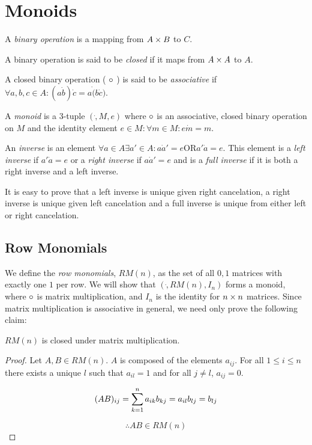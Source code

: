 \chapter{Monoids}

A \emph{binary operation} is a mapping from $A \cross B$ to $ C $.

A binary operation is said to be \emph{closed} if it maps from $A
\cross A$ to $A$.

A closed binary operation ( $ \dot $ ) is said to be
\emph{associative} if $ \forall a,b,c \in A: ( a \dot b ) \dot c = a
\dot ( b \dot c )$.

A \emph{monoid} is a 3-tuple $(\dot, M, e)$ where $\dot$ is an
associative, closed binary operation on $M$ and the identity element $
e \in M: \forall m \in M: e \dot m = m $.

An \emph{inverse} is an element $\forall a \in A \exists a' \in A: a
\dot a' = e \text{OR} a' \dot a = e$.  This element is a \emph{left
  inverse} if $a' \dot a = e$ or a \emph{right inverse} if $a \dot a'
= e$ and is a \emph{full inverse} if it is both a right inverse and a
left inverse.

It is easy to prove that a left inverse is unique given right
cancelation, a right inverse is unique given left cancelation and a
full inverse is unique from either left or right cancelation.

\section{Row Monomials}

We define the \emph{row monomials}, $RM(n)$, as the set of all $0,1$
matrices with exactly one $1$ per row.  We will show that
$(\dot,RM(n),I_n)$ forms a monoid, where $\dot$ is matrix
multiplication, and $I_n$ is the identity for $n \cross n$ matrices.
Since matrix multiplication is associative in general, we need only
prove the following claim:

\begin{claim}

  $RM(n)$ is closed under matrix multiplication.

\end{claim}

\begin{proof}

  Let $A,B \in RM(n)$.  $A$ is composed of the elements $a_{ij}$.  For
  all $1 \leq i \leq n$ there exists a unique $l$ such that $a_{il} =
  1$ and for all $j \neq l$, $a_{ij} = 0$.

  \[
  (AB)_{ij} = \summ{k=1}{n} a_{ik}b_{kj} = a_{il}b_{lj} = b_{lj}
  \]

  \[
  \therefore AB \in RM(n)
  \]
  
\end{proof}

